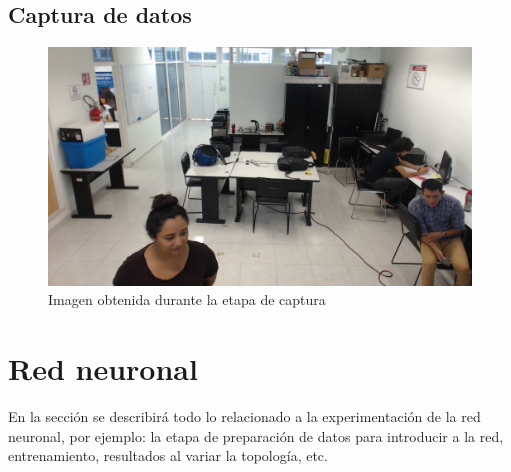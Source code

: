 \subsection{Captura de datos}
\begin{figure}[htbp] 
	\centering
	\includegraphics[width=.65\textwidth]{./pictures/mili}
	\caption{Imagen obtenida durante la etapa de captura}\label{fig: figMili}
\end{figure}

\section{Red neuronal}
En la sección se describirá todo lo relacionado a la experimentación de la red neuronal, por ejemplo: la etapa de preparación de datos para introducir a la red, entrenamiento, resultados al variar la topología, etc.
